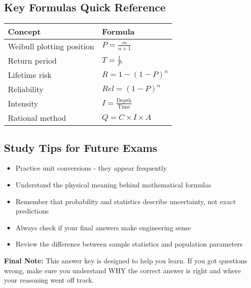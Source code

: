\documentclass[11pt,a4paper]{article}
\begin{document}
\subsection*{Key Formulas Quick Reference}

\begin{tabular}{|l|l|}
\hline
\textbf{Concept} & \textbf{Formula} \\
\hline
Weibull plotting position & $P = \frac{m}{n+1}$ \\
Return period & $T = \frac{1}{P}$ \\
Lifetime risk & $R = 1-(1-P)^n$ \\
Reliability & $Rel = (1-P)^n$ \\
Intensity & $I = \frac{\text{Depth}}{\text{Time}}$ \\
Rational method & $Q = C \times I \times A$ \\
\hline
\end{tabular}

\subsection*{Study Tips for Future Exams}

\begin{itemize}
\item Practice unit conversions - they appear frequently
\item Understand the physical meaning behind mathematical formulas
\item Remember that probability and statistics describe uncertainty, not exact predictions
\item Always check if your final answers make engineering sense
\item Review the difference between sample statistics and population parameters
\end{itemize}

\vspace{1cm}
\textbf{Final Note:} This answer key is designed to help you learn. If you got questions wrong, make sure you understand WHY the correct answer is right and where your reasoning went off track.
\end{document}

